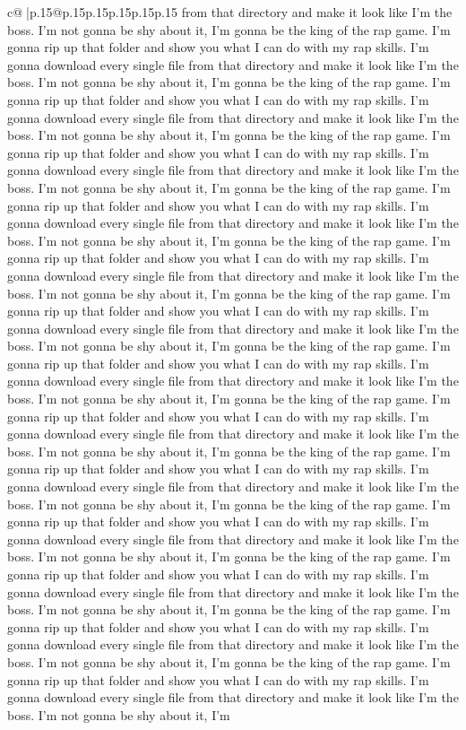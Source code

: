 \documentclass{article}
\begin{document}
{\begin{supertabular}{c@{$\;$}|p{.15\linewidth}@{}p{.15\linewidth}p{.15\linewidth}p{.15\linewidth}p{.15\linewidth}p{.15\linewidth}}
{{{from that directory and make it look like I'm the boss. I'm not gonna be shy about it, I'm gonna be the king of the rap game. I'm gonna rip up that folder and show you what I can do with my rap skills. I'm gonna download every single file from that directory and make it look like I'm the boss. I'm not gonna be shy about it, I'm gonna be the king of the rap game. I'm gonna rip up that folder and show you what I can do with my rap skills. I'm gonna download every single file from that directory and make it look like I'm the boss. I'm not gonna be shy about it, I'm gonna be the king of the rap game. I'm gonna rip up that folder and show you what I can do with my rap skills. I'm gonna download every single file from that directory and make it look like I'm the boss. I'm not gonna be shy about it, I'm gonna be the king of the rap game. I'm gonna rip up that folder and show you what I can do with my rap skills. I'm gonna download every single file from that directory and make it look like I'm the boss. I'm not gonna be shy about it, I'm gonna be the king of the rap game. I'm gonna rip up that folder and show you what I can do with my rap skills. I'm gonna download every single file from that directory and make it look like I'm the boss. I'm not gonna be shy about it, I'm gonna be the king of the rap game. I'm gonna rip up that folder and show you what I can do with my rap skills. I'm gonna download every single file from that directory and make it look like I'm the boss. I'm not gonna be shy about it, I'm gonna be the king of the rap game. I'm gonna rip up that folder and show you what I can do with my rap skills. I'm gonna download every single file from that directory and make it look like I'm the boss. I'm not gonna be shy about it, I'm gonna be the king of the rap game. I'm gonna rip up that folder and show you what I can do with my rap skills. I'm gonna download every single file from that directory and make it look like I'm the boss. I'm not gonna be shy about it, I'm gonna be the king of the rap game. I'm gonna rip up that folder and show you what I can do with my rap skills. I'm gonna download every single file from that directory and make it look like I'm the boss. I'm not gonna be shy about it, I'm gonna be the king of the rap game. I'm gonna rip up that folder and show you what I can do with my rap skills. I'm gonna download every single file from that directory and make it look like I'm the boss. I'm not gonna be shy about it, I'm gonna be the king of the rap game. I'm gonna rip up that folder and show you what I can do with my rap skills. I'm gonna download every single file from that directory and make it look like I'm the boss. I'm not gonna be shy about it, I'm gonna be the king of the rap game. I'm gonna rip up that folder and show you what I can do with my rap skills. I'm gonna download every single file from that directory and make it look like I'm the boss. I'm not gonna be shy about it, I'm gonna be the king of the rap game. I'm gonna rip up that folder and show you what I can do with my rap skills. I'm gonna download every single file from that directory and make it look like I'm the boss. I'm not gonna be shy about it, I'm }}}
\end{supertabular}}
\end{document}
